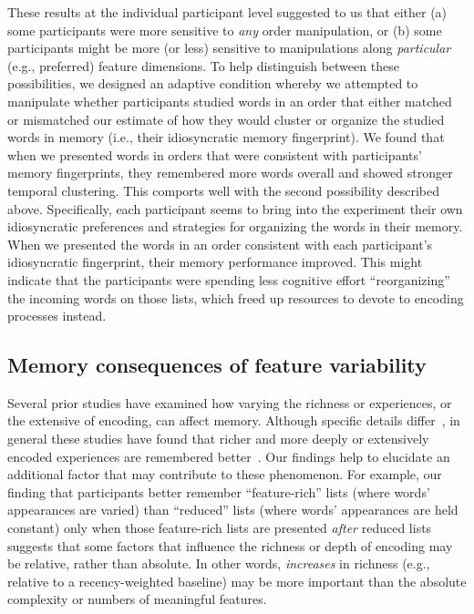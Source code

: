 \documentclass[11pt]{article}
\begin{document}
These results at the individual participant level suggested to us that either
(a) some participants were more sensitive to \textit{any} order manipulation,
or (b) some participants might be more (or less) sensitive to manipulations
along \textit{particular} (e.g., preferred) feature dimensions. To help
distinguish between these possibilities, we designed an adaptive condition
whereby we attempted to manipulate whether participants studied words in an
order that either matched or mismatched our estimate of how they would cluster
or organize the studied words in memory (i.e., their idiosyncratic memory
fingerprint). We found that when we presented words in orders that were
consistent with participants' memory fingerprints, they remembered more words
overall and showed stronger temporal clustering. This comports well with the
second possibility described above. Specifically, each participant seems to
bring into the experiment their own idiosyncratic preferences and strategies
for organizing the words in their memory. When we presented the words in an
order consistent with each participant's idiosyncratic fingerprint, their
memory performance improved. This might indicate that the participants were
spending less cognitive effort ``reorganizing'' the incoming words on those
lists, which freed up resources to devote to encoding processes instead.


\subsection*{Memory consequences of feature variability}

Several prior studies have examined how varying the richness or experiences, or
the extensive of encoding, can affect memory. Although specific details
differ~\citep{BoniEtal22}, in general these studies have found that richer and
more deeply or extensively encoded experiences are remembered
better~\citep{HargEtal12, Mada21, MeinEtal20}. Our findings help to elucidate
an additional factor that may contribute to these phenomenon. For example, our
finding that participants better remember ``feature-rich'' lists (where words'
appearances are varied) than ``reduced'' lists (where words' appearances are
held constant) only when those feature-rich lists are presented \textit{after}
reduced lists suggests that some factors that influence the richness or depth
of encoding may be relative, rather than absolute. In other words,
\textit{increases} in richness (e.g., relative to a recency-weighted baseline)
may be more important than the absolute complexity or numbers of meaningful
features.
\end{document}
